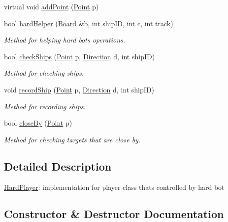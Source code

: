 \begin{DoxyCompactItemize}
virtual void \mbox{\hyperlink{class_hard_player_a77c82c1a36c9e956fdab98837ed888e5}{add\+Point}} (\mbox{\hyperlink{class_point}{Point}} p)
\item 
bool \mbox{\hyperlink{class_hard_player_aec6ff0ed3ef8f47ac46d374cff89e6be}{hard\+Helper}} (\mbox{\hyperlink{class_board}{Board}} \&b, int ship\+ID, int c, int track)
\begin{DoxyCompactList}\small\item\em Method for helping hard bot\textquotesingle{}s operations. \end{DoxyCompactList}\item 
bool \mbox{\hyperlink{class_hard_player_aebad1f5ad6f9ac20eb4f1ca639088c7b}{check\+Ships}} (\mbox{\hyperlink{class_point}{Point}} p, \mbox{\hyperlink{_globals_8h_a224b9163917ac32fc95a60d8c1eec3aa}{Direction}} d, int ship\+ID)
\begin{DoxyCompactList}\small\item\em Method for checking ships. \end{DoxyCompactList}\item 
void \mbox{\hyperlink{class_hard_player_a9358a28f7f0e618d3c98aba7b135e6a8}{record\+Ship}} (\mbox{\hyperlink{class_point}{Point}} p, \mbox{\hyperlink{_globals_8h_a224b9163917ac32fc95a60d8c1eec3aa}{Direction}} d, int ship\+ID)
\begin{DoxyCompactList}\small\item\em Method for recording ships. \end{DoxyCompactList}\item 
bool \mbox{\hyperlink{class_hard_player_a91cdd6239e111ea02bff561f6a3a0c41}{close\+By}} (\mbox{\hyperlink{class_point}{Point}} p)
\begin{DoxyCompactList}\small\item\em Method for checking target\textquotesingle{}s that are close by. \end{DoxyCompactList}\end{DoxyCompactItemize}


\subsection{Detailed Description}
\mbox{\hyperlink{class_hard_player}{Hard\+Player}}\+: implementation for player class that\textquotesingle{}s controlled by hard bot 

\subsection{Constructor \& Destructor Documentation}
\mbox{\label{class_hard_player_a40d564084e88021b21324672bf67b169}} 

